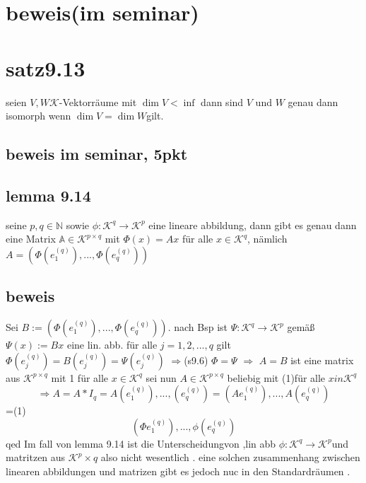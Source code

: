 \documentclass[11pt]{article}
\begin{document}
\section{beweis(im seminar)}
\section{satz9.13}
seien $V,W \mathcal{K}$-Vektorräume mit $\dim V < \inf$ dann sind $V$ und $W$ genau dann isomorph wenn $\dim V=\dim W $gilt.
\subsection{beweis im seminar, 5pkt}
\subsection{lemma 9.14}
seine $p,q \in \mathbb{N}$ sowie $\phi : \mathcal{K}^q\rightarrow\mathcal{K}^p$ eine lineare abbildung, dann gibt es genau dann eine Matrix $\mathbb{A} \in \mathcal{K}^{p\times q}$ mit $\Phi(x)=Ax$
für alle $x \in \mathcal{K}^q$, nämlich $A= (\Phi(e_1^(q)),...,\Phi(e_q^(q)))$
\subsection{beweis}
Sei $B:= (\Phi(e_1^(q)),...,\Phi(e_q^(q)))$. nach Bsp ist $\Psi:\mathcal{K}^q\rightarrow\mathcal{K}^p$ gemäß $\Psi(x):= Bx$
eine lin. abb. für alle $j=1,2,...,q$ gilt $\Phi (e_j^(q))= B(e_j^(q))= \Psi(e_j^(q))$
$\Rightarrow$(s9.6) $\Phi=\Psi$
$\Rightarrow$ $A=B$ ist eine matrix aus $\mathcal{K}^{p\times q}$ mit 
1
für alle $x \in \mathcal{K}^q$
sei nun $A \in \mathcal{K}^{p \times q}$  beliebig mit (1)für alle $x in \mathcal{K}^q$
\[\Rightarrow A=A*I_q=A(e_1^(q)),...,(e_q^(q))=(Ae_1^(q)),...,A(e_q^(q))\]
=(1)
\[(\Phi e_1^(q)),...,\phi(e_q^(q))\]
qed
Im fall von lemma 9.14 ist die Unterscheidungvon ,lin abb $ \phi : \mathcal{K}^q\rightarrow\mathcal{K}^p $und matritzen aus $\mathcal{K}^p\times q$ also nicht wesentlich . eine solchen 
zusammenhang zwischen linearen abbildungen und matrizen gibt es jedoch nuc in den Standardräumen .
\end{document}
